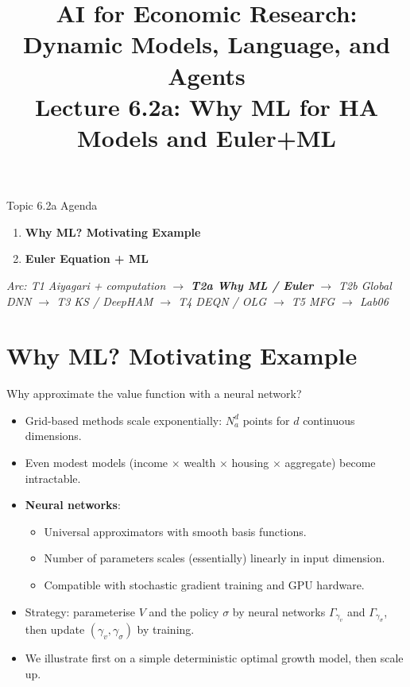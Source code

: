 


\graphicspath{{./pic/}{../../MiniCourse_8hr/Slides/Module2_DL_RL_Macro/pic/}{../}}

\title[AI for Econ Research]{AI for Economic Research: Dynamic Models, Language, and Agents\\
Lecture 6.2a: Why ML for HA Models and Euler+ML}



\makebeamertitle

\begin{frame}{Topic 6.2a Agenda}
\begin{enumerate}
  \item \textbf{Why ML? Motivating Example}
  \medskip
  \item \textbf{Euler Equation + ML}
\end{enumerate}
\medskip
\textit{Arc: T1 Aiyagari + computation $\to$ \textbf{T2a Why ML / Euler} $\to$ T2b Global DNN $\to$ T3 KS / DeepHAM $\to$ T4 DEQN / OLG $\to$ T5 MFG $\to$ Lab06}
\end{frame}

\section{Why ML? Motivating Example}

\begin{frame}{Why approximate the value function with a neural network?}
\begin{itemize}
\item Grid-based methods scale exponentially: $N_a^d$ points for $d$ continuous dimensions.
\medskip
\item Even modest models (income $\times$ wealth $\times$ housing $\times$ aggregate) become intractable.
\medskip
\item \textbf{Neural networks}:
  \begin{itemize}
  \item Universal approximators with smooth basis functions.
  \item Number of parameters scales (essentially) linearly in input dimension.
  \item Compatible with stochastic gradient training and GPU hardware.
  \end{itemize}
\medskip
\item Strategy: parameterise $V$ and the policy $\sigma$ by neural networks $\Gamma_{\gamma_v}$ and $\Gamma_{\gamma_\sigma}$, then update $(\gamma_v,\gamma_\sigma)$ by training.
\medskip
\item We illustrate first on a simple deterministic optimal growth model, then scale up.
\end{itemize}
\end{frame}

